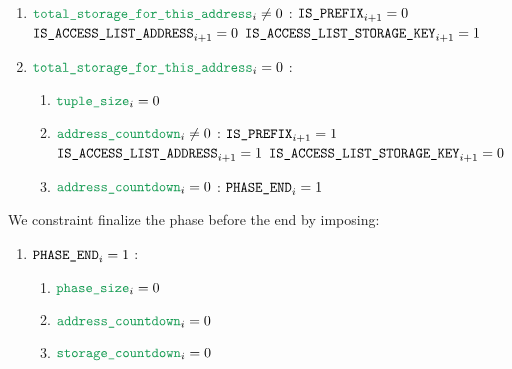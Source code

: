 \begin{enumerate}[resume]
\begin{enumerate}[resume]
\begin{enumerate}
					\item \If $\locTotStorageForThisAddress _{i} \neq 0$ \Then: $\texttt{\texttt{IS\_PREFIX}} _{i + 1} = 0$ \et $\texttt{IS\_ACCESS\_LIST\_ADDRESS} _{i + 1} = 0$ \et $\texttt{IS\_ACCESS\_LIST\_STORAGE\_KEY} _{i + 1} = 1$
					\item \If $\locTotStorageForThisAddress _{i} = 0$ \Then:
						\begin{enumerate}
							\item $\locAccessListTupleSize _{i} = 0$
							\item \If $\locAddressPrewarmingCountdown _{i} \neq 0$ \Then: $\texttt{\texttt{IS\_PREFIX}} _{i + 1} = 1$ \et $\texttt{IS\_ACCESS\_LIST\_ADDRESS} _{i + 1} = 1$ \et $\texttt{IS\_ACCESS\_LIST\_STORAGE\_KEY} _{i + 1} = 0$
							\item \If $\locAddressPrewarmingCountdown _{i} = 0$ \Then: $\texttt{PHASE\_END} _{i} =1$
						\end{enumerate}
				\end{enumerate}
		\end{enumerate}

		We constraint finalize the phase before the end by imposing:
		\begin{enumerate}
			\item \If $\texttt{PHASE\_END} _{i} =1$ \Then:
				\begin{enumerate}
					\item $\locPhaseSize _{i} =0$
					\item $\locAddressPrewarmingCountdown _{i} =0$
					\item $\locStoragePrewarmingCountdown _{i} =0$
				\end{enumerate}
		\end{enumerate}


\end{enumerate}

